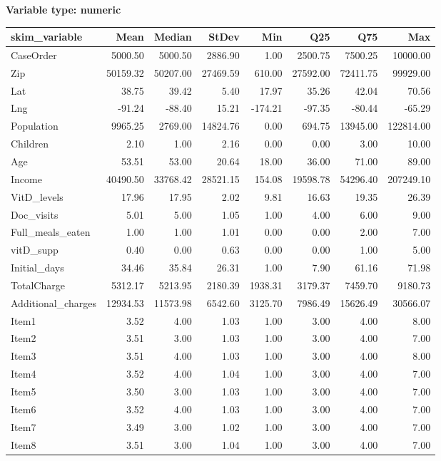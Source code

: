 \documentclass[
]{article}
\begin{document}
\textbf{Variable type: numeric}

\begin{longtable}[]{@{}lrrrrrrr@{}}
\toprule
skim\_variable & Mean & Median & StDev & Min & Q25 & Q75 & Max \\
\midrule
\endhead
CaseOrder & 5000.50 & 5000.50 & 2886.90 & 1.00 & 2500.75 & 7500.25 &
10000.00 \\
Zip & 50159.32 & 50207.00 & 27469.59 & 610.00 & 27592.00 & 72411.75 &
99929.00 \\
Lat & 38.75 & 39.42 & 5.40 & 17.97 & 35.26 & 42.04 & 70.56 \\
Lng & -91.24 & -88.40 & 15.21 & -174.21 & -97.35 & -80.44 & -65.29 \\
Population & 9965.25 & 2769.00 & 14824.76 & 0.00 & 694.75 & 13945.00 &
122814.00 \\
Children & 2.10 & 1.00 & 2.16 & 0.00 & 0.00 & 3.00 & 10.00 \\
Age & 53.51 & 53.00 & 20.64 & 18.00 & 36.00 & 71.00 & 89.00 \\
Income & 40490.50 & 33768.42 & 28521.15 & 154.08 & 19598.78 & 54296.40 &
207249.10 \\
VitD\_levels & 17.96 & 17.95 & 2.02 & 9.81 & 16.63 & 19.35 & 26.39 \\
Doc\_visits & 5.01 & 5.00 & 1.05 & 1.00 & 4.00 & 6.00 & 9.00 \\
Full\_meals\_eaten & 1.00 & 1.00 & 1.01 & 0.00 & 0.00 & 2.00 & 7.00 \\
vitD\_supp & 0.40 & 0.00 & 0.63 & 0.00 & 0.00 & 1.00 & 5.00 \\
Initial\_days & 34.46 & 35.84 & 26.31 & 1.00 & 7.90 & 61.16 & 71.98 \\
TotalCharge & 5312.17 & 5213.95 & 2180.39 & 1938.31 & 3179.37 & 7459.70
& 9180.73 \\
Additional\_charges & 12934.53 & 11573.98 & 6542.60 & 3125.70 & 7986.49
& 15626.49 & 30566.07 \\
Item1 & 3.52 & 4.00 & 1.03 & 1.00 & 3.00 & 4.00 & 8.00 \\
Item2 & 3.51 & 3.00 & 1.03 & 1.00 & 3.00 & 4.00 & 7.00 \\
Item3 & 3.51 & 4.00 & 1.03 & 1.00 & 3.00 & 4.00 & 8.00 \\
Item4 & 3.52 & 4.00 & 1.04 & 1.00 & 3.00 & 4.00 & 7.00 \\
Item5 & 3.50 & 3.00 & 1.03 & 1.00 & 3.00 & 4.00 & 7.00 \\
Item6 & 3.52 & 4.00 & 1.03 & 1.00 & 3.00 & 4.00 & 7.00 \\
Item7 & 3.49 & 3.00 & 1.02 & 1.00 & 3.00 & 4.00 & 7.00 \\
Item8 & 3.51 & 3.00 & 1.04 & 1.00 & 3.00 & 4.00 & 7.00 \\
\bottomrule
\end{longtable}
\end{document}
